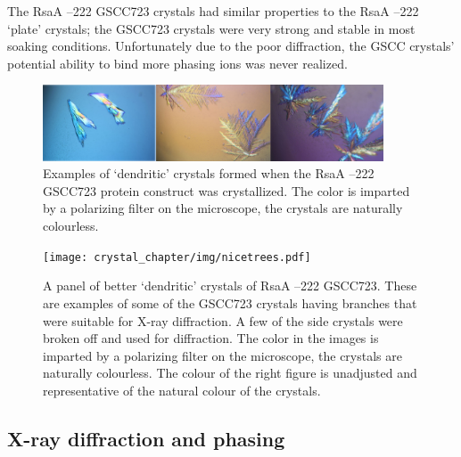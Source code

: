 The RsaA --222 GSCC723 crystals had similar properties to the RsaA --222 `plate' crystals; the GSCC723 crystals were very strong and stable in most soaking conditions. Unfortunately due to the poor diffraction, the GSCC crystals' potential ability to bind more phasing ions was never realized.

\begin{figure}[htb]
  	\begin{center}
   		\includegraphics[width=0.9\textwidth]{crystal_chapter/img/dendroXtals.jpg}
   	\end{center}
   	\caption[Examples of unusable `dendritic' RsaA --222 GSCC723 crystals]{Examples of `dendritic' crystals formed when the RsaA --222 GSCC723 protein construct was crystallized. The color is imparted by a polarizing filter on the microscope, the crystals are naturally colourless.}
   	\label{fig:crystal-dendrites}
\end{figure}

\begin{figure}[htb]
  	\begin{center}
   		\texttt{[image: crystal\_chapter/img/nicetrees.pdf]}
   	\end{center}
   	\caption[`Dendritic' RsaA --222 GSCC723 crystals that were used for X-ray diffraction]{A panel of better `dendritic' crystals of RsaA --222 GSCC723. These are examples of some of the GSCC723 crystals having branches that were suitable for X-ray diffraction. A few of the side crystals were broken off and used for diffraction.  The color in the images is imparted by a polarizing filter on the microscope, the crystals are naturally colourless. The colour of the right figure is unadjusted and representative of the natural colour of the crystals.}
   	\label{fig:nice-trees}
\end{figure}   

\subsection{X-ray diffraction and phasing}\label{sec:x-ray-diffraction}


